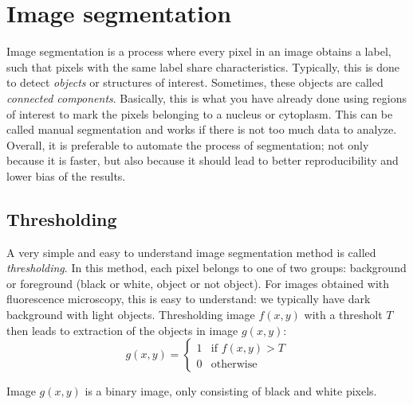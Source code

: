 \section{Image segmentation}

Image segmentation is a process where every pixel in an image obtains a label, such that pixels with the same label share characteristics. Typically, this is done to detect \emph{objects} or structures of interest. Sometimes, these objects are called \emph{connected components}. Basically, this is what you have already done using regions of interest to mark the pixels belonging to a nucleus or cytoplasm. This can be called manual segmentation and works if there is not too much data to analyze. Overall, it is preferable to automate the process of segmentation; not only because it is faster, but also because it should lead to better reproducibility and lower bias of the results. 

\subsection{Thresholding}

A very simple and easy to understand image segmentation method is called \emph{thresholding}. In this method, each pixel belongs to one of two groups: background or foreground (black or white, object or not object). For images obtained with fluorescence microscopy, this is easy to understand: we typically have dark background with light objects. Thresholding image $f\left(x,y\right)$ with a thresholt $T$ then leads to extraction of the objects in image $g\left(x,y\right)$:
	\[
		g\left(x,y\right)=\begin{cases}
		1 &\text{if } f\left(x,y\right)>T\\
		0 &\text{otherwise}
			\end{cases}
\]

Image $g\left(x,y\right)$ is a binary image, only consisting of black and white pixels.

